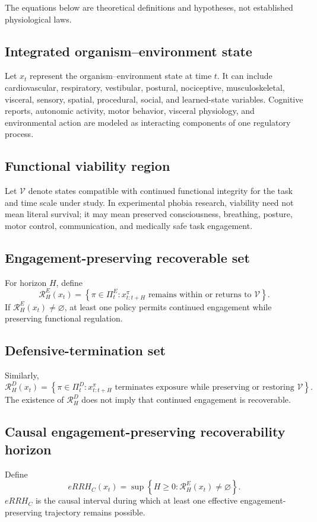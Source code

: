\documentclass[11pt]{article}
\begin{document}
The equations below are theoretical definitions and hypotheses, not established physiological laws.

\subsection{Integrated organism--environment state}
Let $x_t$ represent the organism--environment state at time $t$. It can include cardiovascular, respiratory, vestibular, postural, nociceptive, musculoskeletal, visceral, sensory, spatial, procedural, social, and learned-state variables. Cognitive reports, autonomic activity, motor behavior, visceral physiology, and environmental action are modeled as interacting components of one regulatory process.

\subsection{Functional viability region}
Let $\mathcal{V}$ denote states compatible with continued functional integrity for the task and time scale under study. In experimental phobia research, viability need not mean literal survival; it may mean preserved consciousness, breathing, posture, motor control, communication, and medically safe task engagement.

\subsection{Engagement-preserving recoverable set}
For horizon $H$, define
\[
\mathcal{R}^{E}_{H}(x_t)=
\left\{\pi\in\Pi_t^{E}:x_{t:t+H}^{\pi}\text{ remains within or returns to }\mathcal{V}\right\}.
\]
If $\mathcal{R}^{E}_{H}(x_t)\neq\varnothing$, at least one policy permits continued engagement while preserving functional regulation.

\subsection{Defensive-termination set}
Similarly,
\[
\mathcal{R}^{D}_{H}(x_t)=
\left\{\pi\in\Pi_t^{D}:x_{t:t+H}^{\pi}\text{ terminates exposure while preserving or restoring }\mathcal{V}\right\}.
\]
The existence of $\mathcal{R}^{D}_{H}$ does not imply that continued engagement is recoverable.

\subsection{Causal engagement-preserving recoverability horizon}
Define
\[
eRRH_C(x_t)=\sup\left\{H\ge0:\mathcal{R}^{E}_{H}(x_t)\neq\varnothing\right\}.
\]
$eRRH_C$ is the causal interval during which at least one effective engagement-preserving trajectory remains possible.
\end{document}
